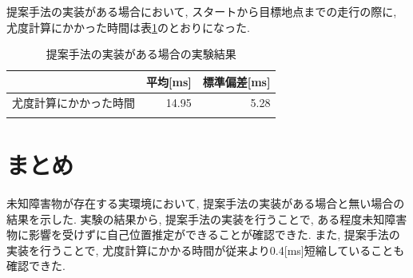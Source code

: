 提案手法の実装がある場合において, スタートから目標地点までの走行の際に, 
尤度計算にかかった時間は表\ref{tabule:likelihood_calc_time_imp}のとおりになった. 

\begin{table}[ht]
  \begin{center}
    \caption{提案手法の実装がある場合の実験結果}
    \label{tabule:likelihood_calc_time_imp}
    \begin{tabular}{l|r|r} 
      \thline
      & 平均[ms] &  標準偏差[ms] \\
      \hline
      尤度計算にかかった時間 & 14.95 & 5.28 \\
      \thline
    \end{tabular}
  \end{center}
\end{table}

\section{まとめ}
未知障害物が存在する実環境において, 提案手法の実装がある場合と無い場合の結果を示した. 
実験の結果から, 提案手法の実装を行うことで, ある程度未知障害物に影響を受けずに自己位置推定ができることが確認できた. 
また, 提案手法の実装を行うことで, 尤度計算にかかる時間が従来より0.4[ms]短縮していることも確認できた. 
